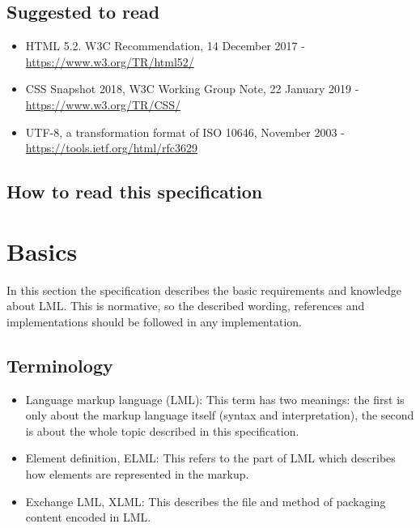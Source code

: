 \documentclass[12pt,a4paper]{article}
\begin{document}
\subsection{Suggested to read}

\begin{itemize}
\item HTML 5.2. W3C Recommendation, 14 December 2017 - \url{https://www.w3.org/TR/html52/}
\item CSS Snapshot 2018, W3C Working Group Note, 22 January 2019 - \url{https://www.w3.org/TR/CSS/}
\item UTF-8, a transformation format of ISO 10646, November 2003 - \url{https://tools.ietf.org/html/rfc3629}
\end{itemize}

\subsection{How to read this specification}

\section{Basics}
In this section the specification describes the basic requirements and knowledge about LML. This is normative, so the described wording, references and implementations should be followed in any implementation.

\subsection{Terminology}
\begin{itemize}
\item Language markup language (LML): This term has two meanings: the first is only about the markup language itself (syntax and interpretation), the second is about the whole topic described in this specification.
\item Element definition, ELML: This refers to the part of LML which describes how elements are represented in the markup.
\item Exchange LML, XLML: This describes the file and method of packaging content encoded in LML.
\end{itemize}
\end{document}
